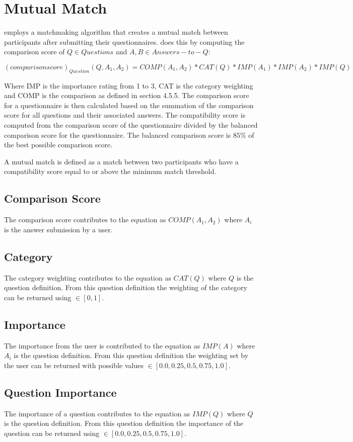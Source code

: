 \section{Mutual Match}
\label{sec:matching}
\Friending{} employs a matchmaking algorithm that creates a mutual match between participants after submitting their questionnaires.  \Friending{} does this by computing the comparison score of $Q \in Questions$ and $A,B \in Answers-to-Q$:

\begin{equation}
(comparison score)_{Question}(Q, A_1, A_2) = COMP(A_1, A_2) * CAT(Q) * IMP(A_1) * IMP(A_2) * IMP(Q) 
\end{equation}

Where IMP is the importance rating from 1 to 3, CAT is the category weighting and COMP is the comparison as defined in section 4.5.5.   The comparison score for a questionnaire is then calculated based on the summation of the comparison score for all questions and their associated answers.
The compatibility score is computed from the comparison score of the questionnaire divided by the balanced comparison score for the questionnaire.  The balanced comparison score is $85\%$ of the best possible comparison score.

A mutual match is defined as a match between two participants who have a compatibility score equal to or above the minimum match threshold.  

\subsection{Comparison Score}
\label{sec:score_comp}

The comparison score contributes to the equation as $COMP(A_1, A_2)$ where $A_i$ is the answer submission by a user.

\subsection{Category}
\label{sec:score_cat}

The category weighting contributes to the equation as $CAT(Q)$ where $Q$ is the question definition. From this question definition the weighting of the category can be returned using $\in [0, 1]$.

\subsection{Importance}
\label{sec:score_imp}

The importance from the user is contributed to the equation as $IMP(A)$ where $A_i$ is the question definition. From this question definition the weighting set by the user can be returned with possible values $\in [ 0.0, 0.25, 0.5, 0.75, 1.0 ]$.

\subsection{Question Importance}
\label{sec:scoreq_qimp}

The importance of a question contributes to the equation as $IMP(Q)$ where $Q$ is the question definition. From this question definition the importance of the question can be returned using $\in [ 0.0, 0.25, 0.5, 0.75, 1.0 ]$.